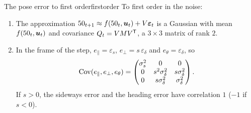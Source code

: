 \begin{proposition}{The pose error to first order}{firstorder}
To first order in the noise:
\begin{enumerate}[label=(\roman*),nosep]
\item The approximation $50_{t+1}\approx f(50_t,\bm{u}_t)+V\bm{\varepsilon}_t$ is a
  Gaussian with mean
  $f(50_t,\bm{u}_t)$ and covariance $Q_t=VMV^{\mathsf{T}}$, a $3\times3$ matrix of rank
  $2$.
\item In the frame of the step, $e_\parallel=\varepsilon_s$,
  $e_\perp=s\,\varepsilon_\delta$ and $e_\theta=\varepsilon_\delta$, so
  \[
    \operatorname{Cov}(e_\parallel,e_\perp,e_\theta)=\begin{pmatrix}\sigma_s^2&0&0\\
    0&s^2\sigma_\delta^2&s\sigma_\delta^2\\0&s\sigma_\delta^2&\sigma_\delta^2
    \end{pmatrix}.
  \]
  If $s>0$, the sideways error and the heading error have correlation
  $1$ ($-1$ if $s<0$).
\end{enumerate}
\end{proposition}

